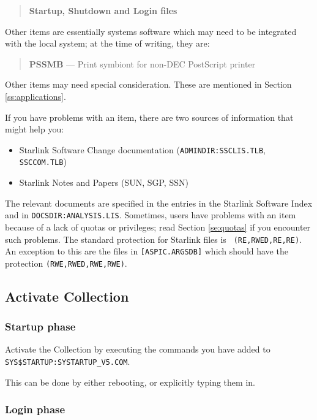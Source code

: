 \begin{quote}
{\bf Startup, Shutdown and Login files}
\end{quote}

Other items are essentially systems software which may need to be integrated
with the local system; at the time of writing, they are:

\begin{quote}
{\bf PSSMB} --- Print symbiont for non-DEC PostScript printer
\end{quote}

Other items may need special consideration. These are mentioned in Section
\ref{ss:applications}.

If you have problems with an item, there are two sources of information that
might help you:

\begin{itemize}
\item Starlink Software Change documentation ({\tt ADMINDIR:SSCLIS.TLB},
{\tt SSCCOM.TLB})
\item Starlink Notes and Papers (SUN, SGP, SSN)
\end{itemize}

The relevant documents are specified in the entries in the Starlink Software
Index and in {\tt DOCSDIR:ANALYSIS.LIS}. Sometimes, users have problems with an
item because of a lack of quotas or privileges; read Section \ref{se:quotas} if
you encounter such problems. The standard protection for Starlink files is {\tt
(RE,RWED,RE,RE)}. An exception to this are the files in {\tt [ASPIC.ARGSDB]}
which should have the protection {\tt (RWE,RWED,RWE,RWE)}.

\subsection {Activate Collection}
\label{ss:activate}

\subsubsection {Startup phase}
\label{subss:startup}

Activate the Collection by executing the commands you have added to
{\tt SYS\$STARTUP:\-SYSTART\-UP\_V5.\-COM}.

This can be done by either rebooting, or explicitly typing them in.

\subsubsection {Login phase}
\label{subss:login}

